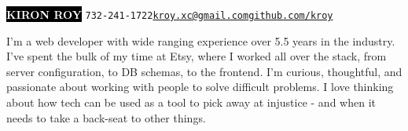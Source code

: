 \documentclass[9pt]{developercv} %
\begin{document}

\begin{minipage}[t]{1\textwidth} %
    \vspace{-\baselineskip} %
    
    \colorbox{black}{{\HUGE\textcolor{white}{\textbf{\MakeUppercase{Kiron Roy}}}}} \hspace{.3 cm} \large\texttt{732-241-1722\slashsep\href{mailto:kroy.xc@gmail.com}{kroy.xc@gmail.com}\slashsep\href{https://github.com/kroy}{github.com/kroy}}
    
    \vspace{6pt}
    
\end{minipage}

\vspace{0.5cm}



\begin{minipage}[t]{0.4\textwidth} %
    \vspace{-\baselineskip} %
    
    I'm a web developer with wide ranging experience over 5.5 years in the industry. I've spent the bulk of my time at Etsy, where I worked all over the stack, from server configuration, to DB schemas, to the frontend. I'm curious, thoughtful, and passionate about working with people to solve difficult problems. I love thinking about how tech can be used as a tool to pick away at injustice - and when it needs to take a back-seat to other things.
\end{minipage}
\hfill %
\begin{minipage}[t]{0.5\textwidth} %
    \vspace{-\baselineskip} %
    \\
    \\
    \\
\end{minipage}
\end{document}

